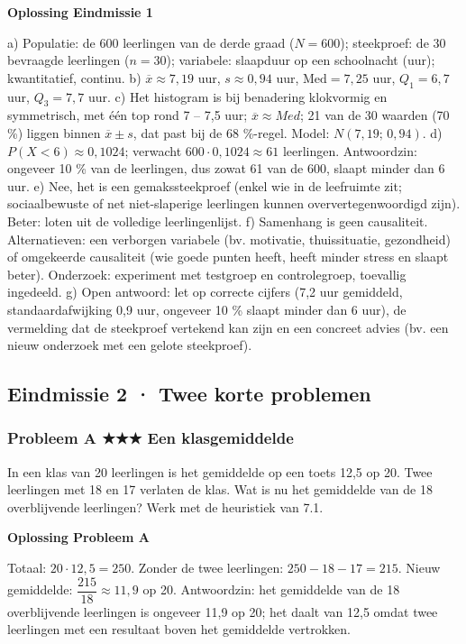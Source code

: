 \begin{oplossing}
\textbf{Oplossing Eindmissie 1}

a) Populatie: de 600 leerlingen van de derde graad ($N=600$); steekproef: de 30 bevraagde leerlingen ($n=30$); variabele: slaapduur op een schoolnacht (uur); kwantitatief, continu. b) $\overline{x}\approx 7{,}19$ uur, $s\approx 0{,}94$ uur, $\text{Med}=7{,}25$ uur, $Q_1=6{,}7$ uur, $Q_3=7{,}7$ uur. c) Het histogram is bij benadering klokvormig en symmetrisch, met één top rond 7 – 7,5 uur; $\overline{x}\approx Med$; 21 van de 30 waarden (70 \%) liggen binnen $\overline{x}\pm s$, dat past bij de 68 \%-regel. Model: $N(7{,}19;\,0{,}94)$. d) $P(X<6)\approx 0{,}1024$; verwacht $600\cdot 0{,}1024\approx 61$ leerlingen. Antwoordzin: ongeveer 10 \% van de leerlingen, dus zowat 61 van de 600, slaapt minder dan 6 uur. e) Nee, het is een gemakssteekproef (enkel wie in de leefruimte zit; sociaalbewuste of net niet-slaperige leerlingen kunnen oververtegenwoordigd zijn). Beter: loten uit de volledige leerlingenlijst. f) Samenhang is geen causaliteit. Alternatieven: een verborgen variabele (bv. motivatie, thuissituatie, gezondheid) of omgekeerde causaliteit (wie goede punten heeft, heeft minder stress en slaapt beter). Onderzoek: experiment met testgroep en controlegroep, toevallig ingedeeld. g) Open antwoord: let op correcte cijfers (7,2 uur gemiddeld, standaardafwijking 0,9 uur, ongeveer 10 \% slaapt minder dan 6 uur), de vermelding dat de steekproef vertekend kan zijn en een concreet advies (bv. een nieuw onderzoek met een gelote steekproef).
\end{oplossing}

\subsection*{Eindmissie 2 · Twee korte problemen}

\subsubsection*{Probleem A \quad ★★★ \quad Een klasgemiddelde}

In een klas van 20 leerlingen is het gemiddelde op een toets 12,5 op 20. Twee leerlingen met 18 en 17 verlaten de klas. Wat is nu het gemiddelde van de 18 overblijvende leerlingen? Werk met de heuristiek van 7.1. \lijn

\begin{oplossing}
\textbf{Oplossing Probleem A}

Totaal: $20\cdot 12{,}5=250$. Zonder de twee leerlingen: $250-18-17=215$. Nieuw gemiddelde: $\dfrac{215}{18}\approx 11{,}9$ op 20. Antwoordzin: het gemiddelde van de 18 overblijvende leerlingen is ongeveer 11,9 op 20; het daalt van 12,5 omdat twee leerlingen met een resultaat boven het gemiddelde vertrokken.
\end{oplossing}

